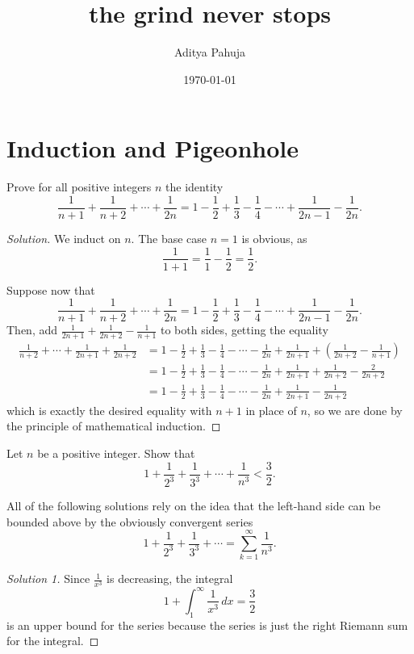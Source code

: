 \documentclass[11pt]{scrartcl}
\title{\vspace{-2em}the grind never stops}
\author{\large Aditya Pahuja}
\date{\today}
\providecommand{\half}{\frac{1}{2}}
\newenvironment{soln}{\begin{proof}[Solution]}{\end{proof}}
\begin{document}
\maketitle
\tableofcontents
\pagebreak

\section{Induction and Pigeonhole}

\begin{problem}
	Prove for all positive integers $n$ the identity
	\[\frac 1{n+1} + \frac 1{n+2} + \cdots + \frac 1{2n} =
	1 - \half + \frac13 - \frac14 - \cdots + \frac1{2n-1} - \frac 1{2n}.\]
\end{problem}
\begin{soln}
	We induct on $n$.
	The base case $n = 1$ is obvious, as
	\[\frac 1{1+1} = \frac 11 - \frac 12 = \half.\]
	
	Suppose now that
	\[\frac 1{n+1} + \frac 1{n+2} + \cdots + \frac 1{2n} =
	1 - \half + \frac13 - \frac14 - \cdots + \frac1{2n-1} - \frac 1{2n}.\]
	Then, add $\frac{1}{2n + 1} + \frac{1}{2n + 2} - \frac{1}{n + 1}$
	to both sides, getting the equality
	\begin{align*}
		\frac 1{n+2} + \cdots + \frac{1}{2n + 1} + \frac 1{2n + 2} &=
		1 - \half + \frac13 - \frac14 - \cdots  - \frac 1{2n}
		+ \frac{1}{2n + 1} + \left(\frac{1}{2n + 2} - \frac{1}{n + 1}\right)\\
		&= 1 - \half + \frac13 - \frac14 - \cdots - \frac 1{2n}
		+ \frac{1}{2n + 1} + \frac{1}{2n + 2} - \frac{2}{2n + 2}\\
		&= 1 - \half + \frac13 - \frac14 - \cdots - \frac 1{2n}
		+ \frac{1}{2n + 1} - \frac{1}{2n + 2}
	\end{align*}
	which is exactly the desired equality with $n + 1$ in place of $n$,
	so we are done by the principle of mathematical induction.
\end{soln}

\begin{problem}
	Let $n$ be a positive integer. Show that
	\[1 + \frac1{2^3} + \frac1{3^3} + \cdots + \frac 1{n^3} < \frac32.\]
\end{problem}

All of the following solutions rely on the idea that
the left-hand side can be bounded above by the obviously convergent series
\[1 + \frac{1}{2^3} + \frac{1}{3^3} + \cdots = \sum_{k=1}^\infty \frac1{n^3}.\]

\begin{proof}[Solution 1]
	Since $\frac1{x^3}$ is decreasing, the integral
	\[1 + \int_1^\infty \frac{1}{x^3}\,dx = \frac32\]
	is an upper bound for the series because the series is just
	the right Riemann sum for the integral.
\end{proof}
\end{document}
